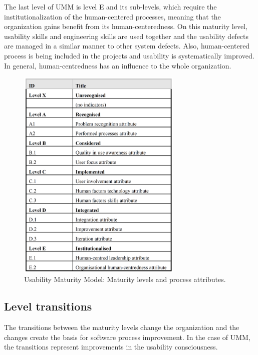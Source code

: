 \documentclass[12pt,a4paper,oneside,pdftex]{report}
\begin{document}
The last level of UMM is level E and its sub-levels, which require the institutionalization of the human-centered processes, meaning that the organization gains benefit from its human-centeredness. On this maturity level, usability skills and engineering skills are used together and the usability defects are managed in a similar manner to other system defects. Also, human-centered process is being included in the projects and usability is systematically improved. In general, human-centredness has an influence to the whole organization. \cite{RefWorks:30}

\begin{figure}[H]
  	\centering
  	\includegraphics[width=0.7\textwidth]{./images/umm_levels.png}\hspace*{4cm}
  	\caption{Usability Maturity Model: Maturity levels and process attributes. \cite{RefWorks:30}}
	\label{fig:umm}
\end{figure}

\subsection{Level transitions}

The transitions between the maturity levels change the organization and the changes create the basis for software process improvement. In the case of UMM, the transitions represent improvements in the usability consciousness. 
\end{document}
